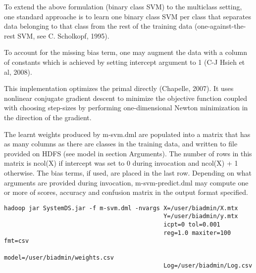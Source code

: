 To extend the above formulation (binary class SVM) to the multiclass setting,
one standard approache is to learn one binary class SVM per class that 
separates data belonging to that class from the rest of the training data 
(one-against-the-rest SVM, see C. Scholkopf, 1995).

To account for the missing bias term, one may augment the data with a column
of constants which is achieved by setting intercept argument to 1 (C-J Hsieh 
et al, 2008).

This implementation optimizes the primal directly (Chapelle, 2007). It uses 
nonlinear conjugate gradient descent to minimize the objective function 
coupled with choosing step-sizes by performing one-dimensional Newton 
minimization in the direction of the gradient.
\\


The learnt weights produced by m-svm.dml are populated into a matrix that 
has as many columns as there are classes in the training data, and written 
to file provided on HDFS (see model in section Arguments). The number of rows
in this matrix is ncol(X) if intercept was set to 0 during invocation and ncol(X) + 1
otherwise. The bias terms, if used, are placed in the last row. Depending on what
arguments are provided during invocation, m-svm-predict.dml may compute one or more
of scores, accuracy and confusion matrix in the output format specified.
\\

\begin{verbatim}
hadoop jar SystemDS.jar -f m-svm.dml -nvargs X=/user/biadmin/X.mtx 
                                             Y=/user/biadmin/y.mtx 
                                             icpt=0 tol=0.001
                                             reg=1.0 maxiter=100 fmt=csv 
                                             model=/user/biadmin/weights.csv
                                             Log=/user/biadmin/Log.csv
\end{verbatim}


